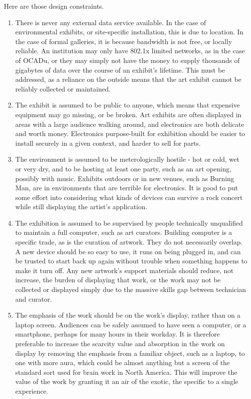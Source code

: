 Here are those design constraints.
\begin{enumerate}
  \item There is never any external data service available.
  In the case of environmental exhibits, or site-specific installation, this is due to location. In the case of formal galleries, it is because bandwidth is not free, or locally reliable. An institution may only have 802.1x limited networks, as in the case of OCADu, or they may simply not have the money to supply thousands of gigabytes of data over the course of an exhibit's lifetime. This must be addressed, as a reliance on the outside means that the art exhibit cannot be reliably collected or maintained.
  \item The exhibit is assumed to be public to anyone, which means that expensive equipment may go missing, or be broken.
  Art exhibits are often displayed in areas with a large audience walking around, and electronics are both delicate and worth money. Electronics purpose-built for exhibition should be easier to install securely in a given context, and harder to sell for parts. 
  \item The environment is assumed to be meterologically hostile - hot or cold, wet or very dry, and to be hosting at least one party, such as an art opening, possibly with music.
  Exhibits outdoors or in new venues, such as Burning Man, are in environments that are terrible for electronics. It is good to put some effort into considering what kinds of devices can survive a rock concert while still displaying the artist's application.
  \item The exhibition is assumed to be supervised by people technically unqualified to maintain a full computer, such as art curators.
  Building computer is a specific trade, as is the curation of artwork. They do not necessarily overlap. A new device should be so easy to use, it runs on being plugged in, and can be trusted to start back up again without trouble when something happens to make it turn off. Any new artwork's support materials should reduce, not increase, the burden of displaying that work, or the work may not be collected or displayed simply due to the massive skills gap between technician and curator.
  \item The emphasis of the work should be on the work's display, rather than on a laptop screen.
  Audiences can be safely assumed to have seen a computer, or a smartphone, perhaps for many hours in their workday. It is therefore preferable to increase the scarcity value and absorption in the work on display by removing the emphasis from a familiar object, such as a laptop, to one with more aura, which could be almost anything but a screen of the standard sort used for brain work in North America. This will improve the value of the work by granting it an air of the exotic, the specific to a single experience.

\end{enumerate}
